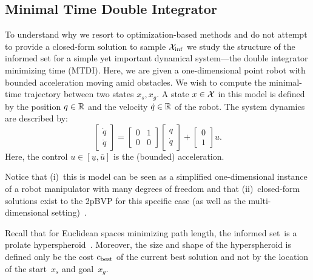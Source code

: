 \documentclass[letterpaper, 10 pt, conference]{ieeeconf}  %
\begin{document}
\subsection{Minimal Time Double Integrator}
To understand why we resort to optimization-based methods and do not attempt to provide a closed-form solution to sample $\mathcal{X}_{\rm {inf}}$ we study the structure of the informed set for a simple yet important dynamical system---the double integrator minimizing time (MTDI). 
Here, we are given a one-dimensional point robot with bounded acceleration moving amid obstacles. We wish to compute the minimal-time trajectory between two states $x_s, x_g$.
A state $x \in \mathcal{X}$ in this model is defined by 
the position $q \in \mathbb{R}$
and
the velocity $\dot{q}\in \mathbb{R}$ of the robot.
The system dynamics are described by:
\begin{equation}
\begin{bmatrix}
	\dot{q} \\
	\ddot{q}
\end{bmatrix}
=
\begin{bmatrix}
	0 & 1 \\
	0 & 0
\end{bmatrix}
\begin{bmatrix}
	{q} \\
	\dot{q}
\end{bmatrix}
+
\begin{bmatrix}
	0 \\
	1
\end{bmatrix}
u.
\end{equation}
Here, the control 
$u \in [\underline{u}, \overline{u}]$ 
is the (bounded) acceleration.


Notice that 
(i)~this is model can be seen as a simplified one-dimensional instance of a robot manipulator with many degrees of freedom and that
(ii)~closed-form solutions exist to the 2pBVP for this specific case (as well as the multi-dimensional setting)~\cite{HN10, KS14}.

Recall that for Euclidean spaces minimizing path length, the informed set~\Cinf is a prolate hyperspheroid~\cite{GSB14}.
Moreover, the size and shape of the hyperspheroid is defined only be the cost $c_{\rm best}$ of the current best solution and not by the location of the start~$x_s$ and goal~$x_g$.
\end{document}
